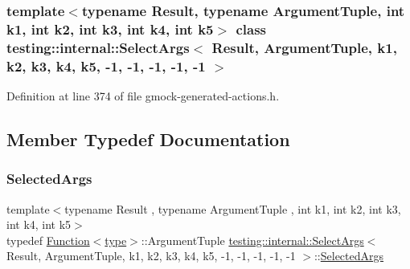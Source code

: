 \subsubsection*{template$<$typename Result, typename Argument\+Tuple, int k1, int k2, int k3, int k4, int k5$>$\newline
class testing\+::internal\+::\+Select\+Args$<$ Result, Argument\+Tuple, k1, k2, k3, k4, k5, -\/1, -\/1, -\/1, -\/1, -\/1 $>$}



Definition at line 374 of file gmock-\/generated-\/actions.\+h.



\subsection{Member Typedef Documentation}
\mbox{\label{classtesting_1_1internal_1_1SelectArgs_3_01Result_00_01ArgumentTuple_00_01k1_00_01k2_00_01k3_00_dabb861d0dfd59e876e4adc8d7e61c25_adc02f2ce0bec0329a74a88e01a586ca1}} 
\subsubsection{\texorpdfstring{Selected\+Args}{SelectedArgs}}
{\footnotesize\ttfamily template$<$typename Result , typename Argument\+Tuple , int k1, int k2, int k3, int k4, int k5$>$ \\
typedef \hyperlink{structtesting_1_1internal_1_1Function}{Function}$<$\hyperlink{classtesting_1_1internal_1_1SelectArgs_3_01Result_00_01ArgumentTuple_00_01k1_00_01k2_00_01k3_00_dabb861d0dfd59e876e4adc8d7e61c25_a64b825d66ab0457b44e260b2fd7e1946}{type}$>$\+::Argument\+Tuple \hyperlink{classtesting_1_1internal_1_1SelectArgs}{testing\+::internal\+::\+Select\+Args}$<$ Result, Argument\+Tuple, k1, k2, k3, k4, k5, -\/1, -\/1, -\/1, -\/1, -\/1 $>$\+::\hyperlink{classtesting_1_1internal_1_1SelectArgs_3_01Result_00_01ArgumentTuple_00_01k1_00_01k2_00_01k3_00_dabb861d0dfd59e876e4adc8d7e61c25_adc02f2ce0bec0329a74a88e01a586ca1}{Selected\+Args}}



